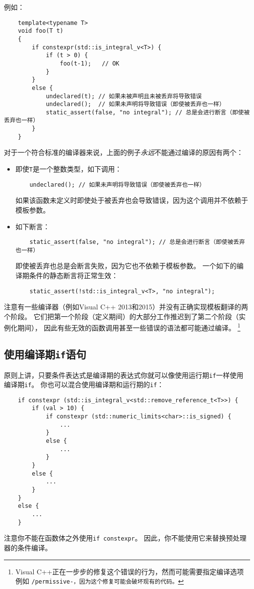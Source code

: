 例如：
\begin{lstlisting}
    template<typename T>
    void foo(T t)
    {
        if constexpr(std::is_integral_v<T>) {
            if (t > 0) {
                foo(t-1);   // OK
            }
        }
        else {
            undeclared(t); // 如果未被声明且未被丢弃将导致错误
            undeclared();  // 如果未声明将导致错误（即使被丢弃也一样）
            static_assert(false, "no integral"); // 总是会进行断言（即使被丢弃也一样）
        }
    }
\end{lstlisting}
对于一个符合标准的编译器来说，上面的例子\emph{永远}不能通过编译的原因有两个：
\begin{itemize}[leftmargin=*]
    \item 即使\texttt{T}是一个整数类型，如下调用：
    \begin{lstlisting}
    undeclared(); // 如果未声明将导致错误（即使被丢弃也一样）
    \end{lstlisting}
    如果该函数未定义时即使处于被丢弃也会导致错误，因为这个调用并不依赖于模板参数。
    \item 如下断言：
    \begin{lstlisting}
    static_assert(false, "no integral"); // 总是会进行断言（即使被丢弃也一样）
    \end{lstlisting}
    即使被丢弃也总是会断言失败，因为它也不依赖于模板参数。
    一个如下的编译期条件的静态断言将正常生效：
    \begin{lstlisting}
    static_assert(!std::is_integral_v<T>, "no integral");
    \end{lstlisting}
\end{itemize}
注意有一些编译器（例如Visual C++ 2013和2015）并没有正确实现模板翻译的两个阶段。
它们把第一个阶段（定义期间）的大部分工作推迟到了第二个阶段（实例化期间），
因此有些无效的函数调用甚至一些错误的语法都可能通过编译。
\footnote{Visual C++正在一步步的修复这个错误的行为，然而可能需要指定编译选项例如
\texttt{/permissive-，因为这个修复可能会破坏现有的代码。}}

\subsection{使用编译期\texttt{if}语句}
原则上讲，只要条件表达式是编译期的表达式你就可以像使用运行期\texttt{if}一样使用编译期\texttt{if}。
你也可以混合使用编译期和运行期的\texttt{if}：
\begin{lstlisting}
    if constexpr (std::is_integral_v<std::remove_reference_t<T>>) {
        if (val > 10) {
            if constexpr (std::numeric_limits<char>::is_signed) {
                ...
            }
            else {
                ...
            }
        }
        else {
            ...
        }
    }
    else {
        ...
    }
\end{lstlisting}
注意你不能在函数体之外使用\texttt{if constexpr}。
因此，你不能使用它来替换预处理器的条件编译。

